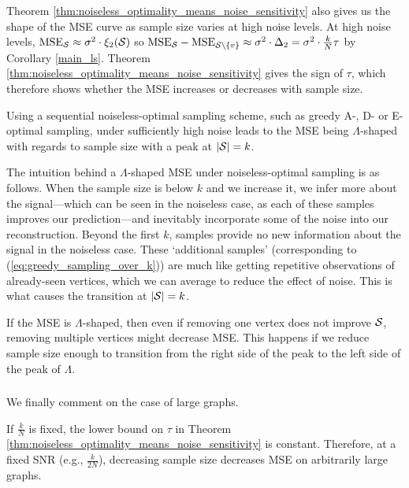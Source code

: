 Theorem \ref{thm:noiseless_optimality_means_noise_sensitivity} also gives us the shape of the MSE curve as sample size varies at high noise levels. {\color{black} At high noise levels, $\text{MSE}_{\mathcal{S}} \approx \sigma^{2} \cdot \xi_{2}(\mathcal{S})$ so  $\text{MSE}_{\mathcal{S}} - \text{MSE}_{\mathcal{S}\backslash \{v\}} \approx \sigma^{2} \cdot \Delta_{2} = \sigma^{2} \cdot \frac{k}{N} \tau$ by Corollary \ref{main_ls}. Theorem \ref{thm:noiseless_optimality_means_noise_sensitivity} gives the sign of $\tau$, which therefore shows whether the MSE increases or decreases with sample size.}%

\begin{remark}
\label{remark:LS_error_lambda_shaped}
Using a sequential noiseless-optimal sampling scheme, such as greedy A-, D- or E- optimal sampling, under sufficiently high noise leads to the MSE being $\Lambda$-shaped with regards to sample size with a peak at $|\mathcal{S}| = k$.
\end{remark}

The intuition behind a $\Lambda$-shaped MSE under noiseless-optimal sampling is as follows. When the sample size is below $k$ and we increase it, we infer more about the signal---which can be seen in the noiseless case, as each of these samples improves our prediction---and inevitably incorporate some of the noise into our reconstruction. Beyond the first $k$, samples provide no new information about the signal in the noiseless case. These `additional samples' (corresponding to (\ref{eq:greedy_sampling_over_k})) are much like getting repetitive observations of already-seen vertices, which we can average to reduce the effect of noise. This is what causes the transition at $|\mathcal{S}|=k$.
    
\begin{remark}
\label{remark:remove_multiple_nodes}
    If the MSE is $\Lambda$-shaped, then even if removing one vertex does not improve $\mathcal{S}$, removing multiple vertices might decrease MSE. This happens if we reduce sample size enough to transition from the right side of the peak to the left side of the peak of $\Lambda$.
\end{remark}

\subsubsection{}
We finally comment on the case of large graphs. 
{\color{black}
\begin{remark}
\label{rmk:LS_big_N}
If $\frac{k}{N}$ is fixed, the lower bound on $\tau$ in Theorem \ref{thm:noiseless_optimality_means_noise_sensitivity} is constant. Therefore, at a fixed SNR (e.g., $\frac{k}{2N}$), decreasing sample size decreases MSE on arbitrarily large graphs.
\end{remark}}



